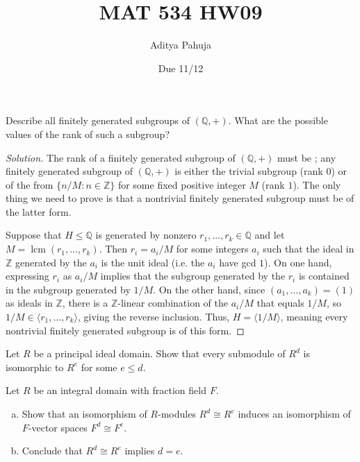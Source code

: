 \documentclass[10pt]{article}
\title{MAT 534 HW09}
\author{\large Aditya Pahuja}
\date{\large Due 11/12}
\providecommand{\QQ}{\mathbb Q}
\providecommand{\ZZ}{\mathbb Z}
\providecommand{\ii}{\item}
\newenvironment{soln}{\begin{proof}[Solution]}{\end{proof}}
\providecommand{\lcm}{\operatorname{lcm}}
\begin{document}
\maketitle

\begin{problem}
    Describe all finitely generated subgroups of $(\QQ,+)$.
    What are the possible values of the rank of such a subgroup?
\end{problem}

\begin{soln}
    The rank of a finitely generated subgroup of $(\QQ,+)$
    must be ; any finitely generated subgroup of $(\QQ,+)$
    is either the trivial subgroup (rank $0$) or of the from $\{n/M : n\in\ZZ\}$
    for some fixed positive integer $M$ (rank $1$).
    The only thing we need to prove is that a nontrivial
    finitely generated subgroup must be of the latter form.

    Suppose that $H\le\QQ$ is generated by nonzero $r_1,\dots,r_k\in\QQ$
    and let $M = \lcm(r_1,\dots,r_k)$.
    Then $r_i = a_i/M$ for some integers $a_i$ such that
    the ideal in $\ZZ$ generated by the $a_i$ is the unit ideal
    (i.e. the $a_i$ have gcd $1$).
    On one hand, expressing $r_i$ as $a_i/M$ implies that
    the subgroup generated by the $r_i$ is contained in
    the subgroup generated by $1/M$.
    On the other hand, since $(a_1,\dots,a_k) = (1)$
    as ideals in $\ZZ$, there is a $\ZZ$-linear combination of the $a_i/M$
    that equals $1/M$, so $1/M\in\langle r_1,\dots,r_k\rangle$,
    giving the reverse inclusion. Thus, $H = \langle 1/M\rangle$,
    meaning every nontrivial finitely generated subgroup is of this form.
\end{soln}

\begin{problem}
    Let $R$ be a principal ideal domain.
    Show that every submodule of $R^d$
    is isomorphic to $R^e$ for some $e\le d$.
\end{problem}

\begin{problem}
    Let $R$ be an integral domain with fraction field $F$.
    \begin{enumerate}[(a)]
        \ii Show that an isomorphism of $R$-modules $R^d\cong R^e$
	induces an isomorphism of $F$-vector spaces $F^d\cong F^e$.
	\ii Conclude that $R^d\cong R^e$ implies $d=e$.
    \end{enumerate}
\end{problem}
\end{document}
